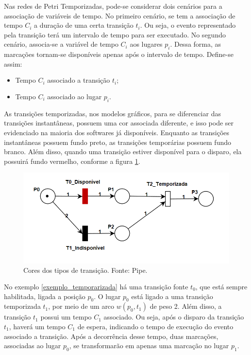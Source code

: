 \documentclass[
	12pt,				%
	openright,			%
	oneside,			%
	a4paper,			%
	english,			%
	brazil				%
	]{abntex2}
\begin{document}
Nas redes de Petri Temporizadas, pode-se considerar dois cenários para a associação de variáveis de tempo. No primeiro cenário, se tem a associação de tempo $C_{i}$ a duração de uma certa transição $t_{i}$. Ou seja, o evento representado pela transição terá um intervalo de tempo para ser executado. No segundo cenário, associa-se a variável de tempo $C_{i}$ aos lugares $p_{i}$. Dessa forma, as marcações tornam-se disponíveis apenas após o intervalo de tempo. Define-se assim: 

\begin{itemize}
        \item Tempo $C_{i}$ associado a transição $t_{i}$;
        \item Tempo $C_{i}$ associado ao lugar $p_{i}$.
\end{itemize}

As transições temporizadas, nos modelos gráficos, para se diferenciar das transições instantâneas, possuem uma cor associada diferente, e isso pode ser evidenciado na maioria dos softwares já disponíveis. Enquanto as transições instantâneas possuem fundo preto, as transições temporárias possuem fundo branco. Além disso, quando uma transição estiver disponível para o disparo, ela possuirá fundo vermelho, conforme a figura \ref{fig:cores_transição}. 

\begin{figure}[ht] 
	\centering
	\includegraphics[scale=0.75]{figuras/exemplo_cores_transicao.png}
	\caption[Cores dos tipos de transição]{Cores dos tipos de transição. Fonte: Pipe.}
	\label{fig:cores_transição}
\end{figure}

No exemplo \ref{exemplo_temporarizada} há uma transição fonte $t_{0}$, que está sempre habilitada, ligada a posição $p_{0}$. O lugar $p_{0}$ está ligado a uma transição temporizada $t_{1}$, por meio de um arco $w(p_{0},t_{1})$ de peso 2. Além disso, a transição $t_{1}$ possui um tempo $C_{1}$ associado. Ou seja, após o disparo da transição $t_{1}$, haverá um tempo $C_{1}$ de espera, indicando o tempo de execução do evento associado a transição. Após a decorrência desse tempo, duas marcações, associadas ao lugar $p_{0}$, se transformarão em apenas uma marcação no lugar $p_{1}$.  
\end{document}
